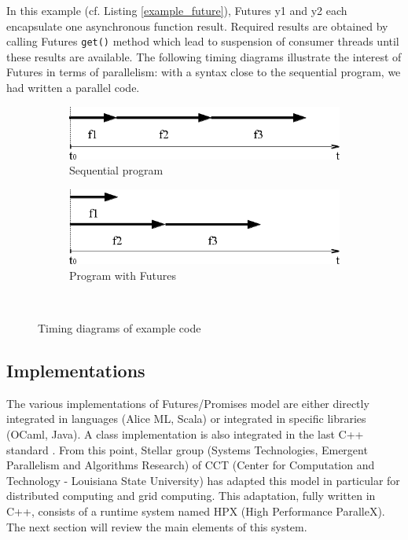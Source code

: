 \documentclass{llncs}
\begin{document}
In this example (cf. Listing \ref{example_future}), Futures y1 and y2 each encapsulate one asynchronous function result. Required results are obtained by calling Futures \texttt{get()} method which lead to suspension of consumer threads until these results are available. The following timing diagrams illustrate the interest of Futures in terms of parallelism: with a syntax close to the sequential program, we had written a parallel code.

\begin{figure}[h]
      \begin{subfigure}[b]{0.5\textwidth}
	      \centering
	      \includegraphics[scale=0.4]{Images/Im2.png}
	      \caption{Sequential program}
	      
      \end{subfigure}
      \begin{subfigure}[b]{0.5\textwidth}
	      \centering
	      \includegraphics[scale=0.4]{Images/Im3.png}
	      \caption{Program with Futures}
      \end{subfigure}\\
      
      \caption{Timing diagrams of example code}
      \label{chronofuture}
\end{figure}

\subsection{Implementations}
The various implementations of Futures/Promises model are either directly integrated in languages (Alice ML, Scala) or integrated in specific libraries (OCaml, Java). A class implementation is also integrated in the last C++ standard \cite{Futuresc++}. From this point, Stellar group (Systems Technologies, Emergent Parallelism and Algorithms Research) of CCT (Center for Computation and Technology - Louisiana State University) has adapted this model in particular for distributed computing and grid computing. This adaptation, fully written in C++, consists of a runtime system named HPX (High Performance ParalleX). The next section will review the main elements of this system.   
\end{document}
